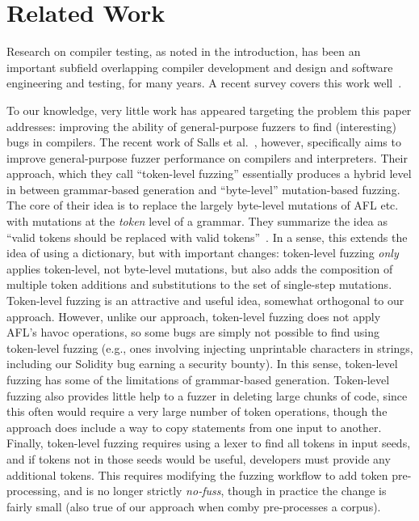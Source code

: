\section{Related Work}

Research on compiler testing, as noted in the introduction, has been an important subfield overlapping compiler development and design and software engineering and testing, for many years.  A recent survey covers this work well~\cite{chen2020survey}.

To our knowledge, very little work has appeared targeting the problem this paper addresses: improving the ability of general-purpose fuzzers to find (interesting) bugs in compilers.  The recent work of Salls et al.~\cite{Salls2021TokenLevel}, however, specifically aims to improve general-purpose fuzzer performance on compilers and interpreters.  Their approach, which they call ``token-level fuzzing'' essentially produces a hybrid level in between grammar-based generation and ``byte-level'' mutation-based fuzzing.  The core of their idea is to replace the largely byte-level mutations of AFL etc. with mutations at the \emph{token} level of a grammar.  They summarize the idea as ``valid tokens should be replaced with valid tokens''~\cite{Salls2021TokenLevel}.  In a sense, this extends the idea of using a dictionary, but with important changes:  token-level fuzzing \emph{only} applies token-level, not byte-level mutations, but also adds the composition of multiple token additions and substitutions to the set of single-step mutations.  Token-level fuzzing is an attractive and useful idea, somewhat orthogonal to our approach.  However, unlike our approach, token-level fuzzing does not apply AFL's havoc operations, so some bugs are simply not possible to find using token-level fuzzing (e.g., ones involving injecting unprintable characters in strings, including our Solidity bug earning a security bounty).  In this sense, token-level fuzzing has some of the limitations of grammar-based generation.  Token-level fuzzing also provides little help to a fuzzer in deleting large chunks of code, since this often would require a very large number of token operations, though the approach does include a way to copy statements from one input to another.  Finally, token-level fuzzing requires using a lexer to find all tokens in input seeds, and if tokens not in those seeds would be useful, developers must provide any additional tokens.  This requires modifying the fuzzing workflow to add token pre-processing, and is no longer strictly \emph{no-fuss}, though in practice the change is fairly small (also true of our approach when comby pre-processes a corpus).